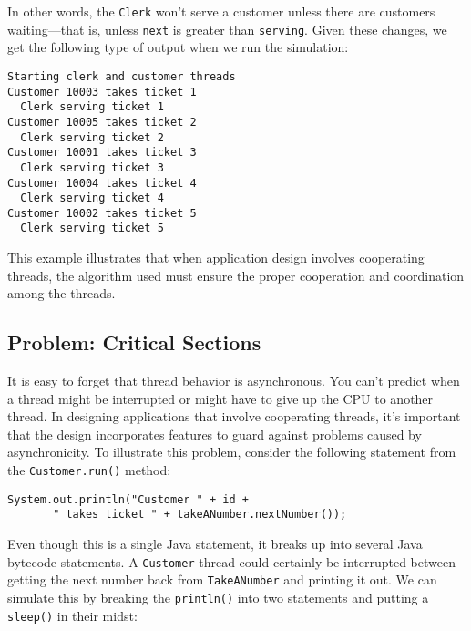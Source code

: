\noindent In other words, the {\tt Clerk} won't serve a customer
unless there are customers waiting---that is, unless {\tt next} is
greater than {\tt serving}.  Given these changes, we get the following
type of output when we run the simulation:

\begin{jjjlisting}
\begin{lstlisting}
Starting clerk and customer threads
Customer 10003 takes ticket 1
  Clerk serving ticket 1
Customer 10005 takes ticket 2
  Clerk serving ticket 2
Customer 10001 takes ticket 3
  Clerk serving ticket 3
Customer 10004 takes ticket 4
  Clerk serving ticket 4
Customer 10002 takes ticket 5
  Clerk serving ticket 5
\end{lstlisting}
\end{jjjlisting}

\noindent This example illustrates that when application design
involves cooperating threads, the algorithm used must ensure the
proper cooperation and coordination among the threads.


\subsection{Problem: Critical Sections}
\noindent It is easy to forget that thread behavior is asynchronous.  You can't
predict when a thread might be interrupted or might have to give up
the CPU to another thread.   In designing applications that involve
cooperating threads, it's important that the design incorporates
features to guard against problems caused by
asynchronicity.   To illustrate this problem, consider the following
statement from the {\tt Customer.run()} method:

\begin{jjjlisting}
\begin{lstlisting}
System.out.println("Customer " + id + 
       " takes ticket " + takeANumber.nextNumber());
\end{lstlisting}
\end{jjjlisting}

\noindent Even though this is a single Java statement, it breaks
up into several Java bytecode statements.  A {\tt Customer} thread
could certainly be interrupted between getting the next number back
from {\tt TakeANumber} and printing it out.  We can simulate this by
breaking the {\tt println()} into two statements and putting a
{\tt sleep()} in their midst:

